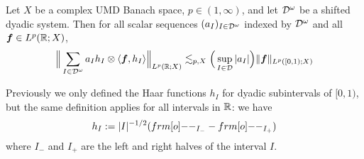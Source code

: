 \begin{thm}\label{thm:general-haar-decompositions}
  Let $X$ be a complex UMD Banach space, $p \in (1,\infty)$, and let $\mathcal{D}^{\omega}$ be a shifted dyadic system.
  Then for all scalar sequences $(a_{I})_{I \in \mathcal{D}^{\omega}}$ indexed by $\mathcal{D}^{\omega}$ and all $\bm{f} \in L^p(\mathbb{R};X)$,
  \begin{equation}\label{eq:generalised-haar}
      \Big\| \sum_{I \in \mathcal{D}^{\omega}} a_{I} h_{I} \otimes \langle \bm{f}, h_{I} \rangle \Big\|_{L^p(\mathbb{R};X)} \lesssim_{p,X} \Big(\sup_{I \in \mathcal{D}} |a_{I}| \Big) \|\bm{f}\|_{L^p([0,1);X)}
  \end{equation}
\end{thm}

\begin{rmk}
  Previously we only defined the Haar functions $h_{I}$ for dyadic subintervals of $[0,1)$, but the same definition applies for all intervals in $\mathbb{R}$:
  we have
  \begin{equation*}
    h_{I} := |I|^{-1/2}(\1_{I_{-}} - \1_{I_{+}})
  \end{equation*}
  where $I_{-}$ and $I_{+}$ are the left and right halves of the interval $I$.
\end{rmk}

